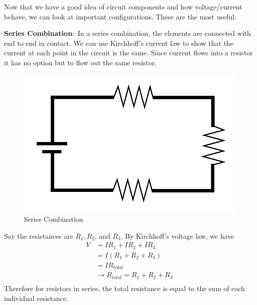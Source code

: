 \documentclass[nobib]{tufte-handout}
\newcommand{\defn}[2]{\noindent\textbf{#1}:\ #2}
\begin{document}
Now that we have a good idea of circuit components and how voltage/current behave, we can look 
at important configurations. These are the most useful:

\defn{Series Combination}{In a series combination, the elements 
are connected with end to end in contact}. We can use Kirchhoff's current
law to show that the current at each point in the circuit is the same. Since current 
flows into a resistor it has no option but to flow out the same resistor.
\begin{figure}
    \center
    \includegraphics[width=\textwidth/2]{images/Series_circuit.svg.png}
    \caption{Series Combination}
    \label{fig:series}
\end{figure}
Say the resistances are $R_1, R_2$, and $R_3$. By Kirchhoff's voltage law, we have
\begin{align*}
    V &= IR_1 + IR_2 + IR_3\\
    &= I(R_1 + R_2 + R_3) \\
    &= IR_{total} \\
    &\rightarrow R_{total} = R_1 + R_2 + R_3\\
\end{align*}
Therefore for resistors in series, the total resistance is 
equal to the sum of each individual resistance. 
\end{document}
